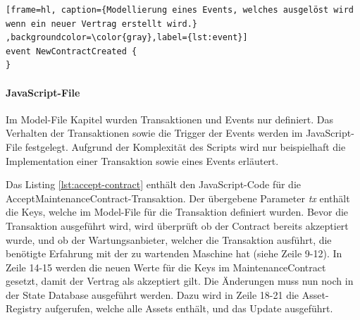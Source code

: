\begin{lstfloat}
\begin{lstlisting}[frame=hl, caption={Modellierung eines Events, welches ausgelöst wird wenn ein neuer Vertrag erstellt wird.} ,backgroundcolor=\color{gray},label={lst:event}]
event NewContractCreated {
}
\end{lstlisting} 
\end{lstfloat}

\paragraph{JavaScript-File}
Im Model-File Kapitel wurden Transaktionen und Events nur definiert. Das Verhalten der Transaktionen sowie die Trigger der Events werden im JavaScript-File festgelegt. Aufgrund der Komplexität des Scripts wird nur beispielhaft die Implementation einer Transaktion sowie eines Events erläutert.

Das Listing \ref{lst:accept-contract} enthält den JavaScript-Code für die AcceptMaintenanceContract-Transaktion. Der übergebene Parameter \textit{tx} enthält die Keys, welche im Model-File für die Transaktion definiert wurden. Bevor die Transaktion ausgeführt wird, wird überprüft ob der Contract bereits akzeptiert wurde, und ob der Wartungsanbieter, welcher die Transaktion ausführt, die benötigte Erfahrung mit der zu wartenden Maschine hat (siehe Zeile 9-12). In Zeile 14-15 werden die neuen Werte für die Keys im MaintenanceContract gesetzt, damit der Vertrag als akzeptiert gilt. Die Änderungen muss nun noch in der State Database ausgeführt werden. Dazu wird in Zeile 18-21 die Asset-Registry aufgerufen, welche alle Assets enthält, und das Update ausgeführt.


